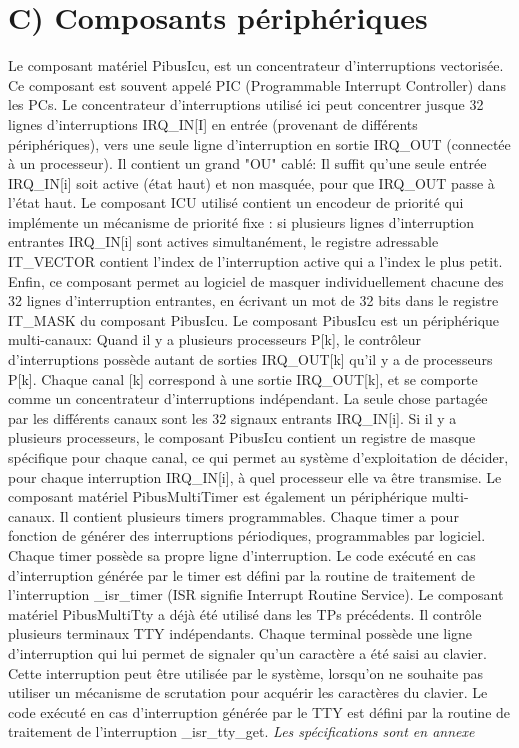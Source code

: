\documentclass[10pt]{article}
\begin{document}
\section{C) Composants périphériques}
Le composant matériel PibusIcu, est un concentrateur d’interruptions vectorisée.
Ce composant est souvent appelé PIC (Programmable Interrupt Controller) dans les
PCs. Le concentrateur d'interruptions utilisé ici peut concentrer jusque 32
lignes d'interruptions IRQ\_IN[I] en entrée (provenant de différents
périphériques), vers une seule ligne d'interruption en sortie IRQ\_OUT (connectée
à un processeur). Il contient un grand "OU" cablé: Il suffit qu'une seule entrée
IRQ\_IN[i] soit active (état haut) et non masquée, pour que IRQ\_OUT passe à
l'état haut.
\newline
Le composant ICU utilisé contient un encodeur de priorité qui implémente un
mécanisme de priorité fixe : si plusieurs lignes d'interruption entrantes
IRQ\_IN[i] sont actives simultanément, le registre adressable IT\_VECTOR
contient l'index de l'interruption active qui a l'index le plus petit. Enfin, ce
composant permet au logiciel de masquer individuellement chacune des 32 lignes
d'interruption entrantes, en écrivant un mot de 32 bits dans le registre
IT\_MASK du composant PibusIcu.
\newline
Le composant PibusIcu est un périphérique multi-canaux: Quand il y a plusieurs
processeurs P[k], le contrôleur d'interruptions possède autant de sorties
IRQ\_OUT[k] qu'il y a de processeurs P[k]. Chaque canal [k] correspond à une
sortie IRQ\_OUT[k], et se comporte comme un concentrateur d'interruptions
indépendant. La seule chose partagée par les différents canaux sont les 32
signaux entrants IRQ\_IN[i]. Si il y a plusieurs processeurs, le composant
PibusIcu contient un registre de masque spécifique pour chaque canal, ce qui
permet au système d'exploitation de décider, pour chaque interruption IRQ\_IN[i],
à quel processeur elle va être transmise.
\newline
Le composant matériel PibusMultiTimer est également un périphérique multi-canaux.
Il contient plusieurs timers programmables. Chaque timer a pour fonction de
générer des interruptions périodiques, programmables par logiciel. Chaque timer
possède sa propre ligne d'interruption. Le code exécuté en cas d’interruption
générée par le timer est défini par la routine de traitement de l’interruption
\_isr\_timer (ISR signifie Interrupt Routine Service).
\newline
Le composant matériel PibusMultiTty a déjà été utilisé dans les TPs précédents.
Il contrôle plusieurs terminaux TTY indépendants. Chaque terminal possède une
ligne d'interruption qui lui permet de signaler qu'un caractère a été saisi au
clavier. Cette interruption peut être utilisée par le système, lorsqu'on ne
souhaite pas utiliser un mécanisme de scrutation pour acquérir les caractères du
clavier. Le code exécuté en cas d’interruption générée par le TTY est défini par
la routine de traitement de l’interruption \_isr\_tty\_get.
\newline
{\it Les spécifications sont en annexe}
\end{document}
